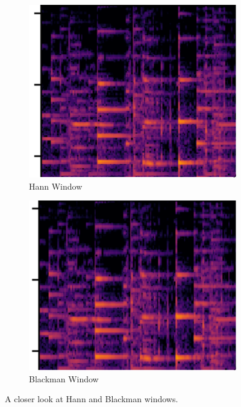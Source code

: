 \documentclass[11pt,a4paper]{article}
\begin{document}
\begin{figure}[ht]
	\centering
	\begin{subfigure}[h]{0.45\textwidth}
		\includegraphics[width=\textwidth]{hannCrop}
		\caption{Hann Window}
		\label{fig:hannCrop}
	\end{subfigure}
	\begin{subfigure}[h]{0.45\textwidth}
		\includegraphics[width=\textwidth]{blackmanCrop}
		\caption{Blackman Window}
		\label{fig:blackmanCrop}
	\end{subfigure}
	\caption{A closer look at Hann and Blackman windows.}
	\label{fig:windowCloseup}
\end{figure}
\end{document}
